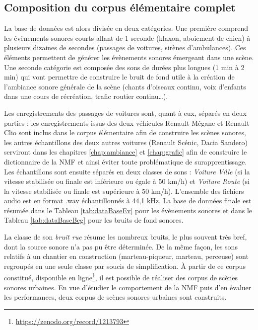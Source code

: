 \subsection{Composition du corpus élémentaire complet}

La base de données est alors divisée en deux catégories. Une première comprend les évènements sonores courts allant de 1 seconde (klaxon, aboiement de chien) à plusieurs dizaines de secondes (passages de voitures, sirènes d'ambulances). Ces éléments permettent de générer les évènements sonores émergeant dans une scène. Une seconde catégorie est composée des sons de durées plus longues (1 min à 2 min) qui vont permettre de construire le bruit de fond utile à la création de l'ambiance sonore générale de la scène (chants d'oiseaux continu, voix d'enfants dans une cours de récréation, trafic routier continu\dots).

Les enregistrements des passages de voitures sont, quant à eux, séparés en deux parties : les enregistrements issus des deux  véhicules Renault Mégane et Renault Clio sont inclus dans le corpus élémentaire afin de construire les scènes sonores, les autres échantillons des deux autres voitures (Renault Scénic, Dacia Sandero) serviront dans les chapitres \ref{chap:ambiance} et \ref{chap:grafic} afin de construire le dictionnaire de la NMF et ainsi éviter toute problématique de surapprentissage.
Les échantillons sont ensuite séparés en deux classes de sons : \textit{Voiture Ville} (si la vitesse stabilisée ou finale est inférieure ou égale à 50 km/h) et \textit{Voiture Route} (si la vitesse stabilisée ou finale est supérieure à 50 km/h). L'ensemble des fichiers audio est en format .wav échantillonnés à 44,1 kHz. La base de données finale est résumée dans le Tableau \ref{tab:dataBaseEv} pour les évènements sonores et dans le Tableau \ref{tab:dataBaseBcg} pour les bruits de fond sonores.



La classe de son \textit{bruit rue} résume les nombreux bruits, le plus souvent très bref, dont la source sonore n'a pas pu être déterminée. De la même façon, les sons relatifs à un chantier en construction (marteau-piqueur, marteau, perceuse) sont regroupés en une seule classe par soucis de simplification.
À partir de ce corpus constitué, disponible en ligne\footnote{\url{https://zenodo.org/record/1213793}}, il est possible de réaliser des corpus de scènes sonores urbaines. En vue d'étudier le comportement de la NMF puis d'en évaluer les performances, deux corpus de scènes sonores urbaines sont construits.

